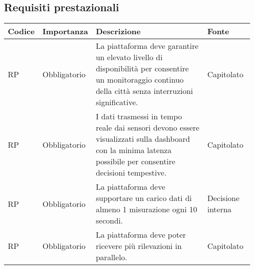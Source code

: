 \subsection{Requisiti prestazionali}
\setcounter{rowcounter}{0}
\begin{longtable}{|C{1.5cm}|C{2cm}|L{5cm}|C{2cm}|}
    \hline
    \textbf{Codice} & \textbf{Importanza} & \textbf{Descrizione} & \textbf{Fonte}  \\

    \hline
     RP & Obbligatorio & La piattaforma deve garantire un elevato livello di disponibilità per consentire un monitoraggio continuo della città senza interruzioni significative. & Capitolato \\ 

    \hline
     RP & Obbligatorio & I dati trasmessi in tempo reale dai sensori devono essere visualizzati sulla dashboard con la minima latenza possibile per consentire decisioni tempestive. & Capitolato \\

    \hline
     RP & Obbligatorio & La piattaforma deve supportare un carico dati di almeno 1 misurazione ogni 10 secondi. & Decisione interna \\

    \hline
     RP & Obbligatorio & La piattaforma deve poter ricevere più rilevazioni in parallelo. & Capitolato \\

    \hline
\end{longtable}
